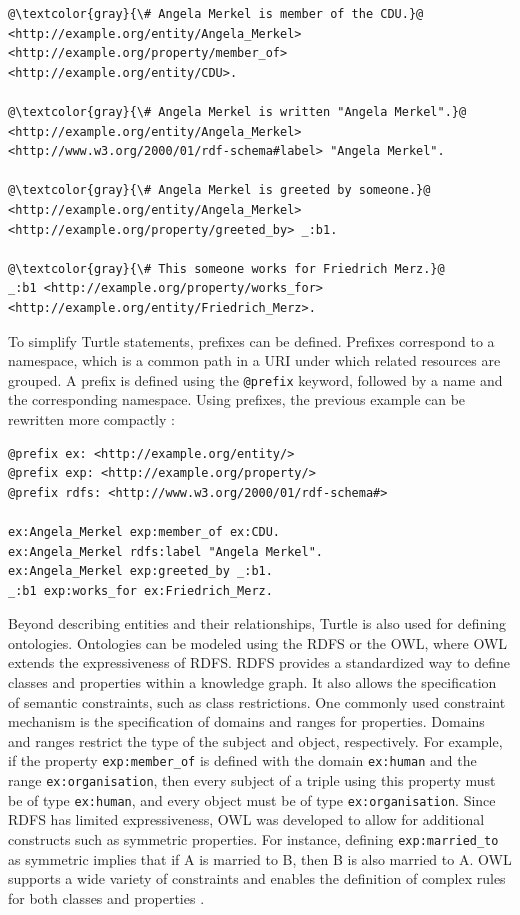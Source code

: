 \documentclass[a4paper,oneside,bibliography=totoc]{scrbook}
\begin{document}
\begin{lstlisting}[language=Turtle, caption=Example of a Knowledge Graph in Turtle Format, label=lst:turtle_example, escapechar=@]
@\textcolor{gray}{\# Angela Merkel is member of the CDU.}@
<http://example.org/entity/Angela_Merkel> <http://example.org/property/member_of> <http://example.org/entity/CDU>.

@\textcolor{gray}{\# Angela Merkel is written "Angela Merkel".}@
<http://example.org/entity/Angela_Merkel> <http://www.w3.org/2000/01/rdf-schema#label> "Angela Merkel".

@\textcolor{gray}{\# Angela Merkel is greeted by someone.}@
<http://example.org/entity/Angela_Merkel> <http://example.org/property/greeted_by> _:b1.

@\textcolor{gray}{\# This someone works for Friedrich Merz.}@
_:b1 <http://example.org/property/works_for> <http://example.org/entity/Friedrich_Merz>.
\end{lstlisting}

To simplify Turtle statements, prefixes can be defined. Prefixes correspond to a namespace, which is a common path in a \ac{URI} under which related resources are grouped. A prefix is defined using the \texttt{@prefix} keyword, followed by a name and the corresponding namespace. Using prefixes, the previous example can be rewritten more compactly \cite{Tomaszuk2020}:

\begin{lstlisting}[language=Turtle, caption=Example of a Knowledge Graph in Turtle Format with Prefixes, label=lst:turtle_example]
@prefix ex: <http://example.org/entity/>
@prefix exp: <http://example.org/property/>
@prefix rdfs: <http://www.w3.org/2000/01/rdf-schema#>

ex:Angela_Merkel exp:member_of ex:CDU.
ex:Angela_Merkel rdfs:label "Angela Merkel".
ex:Angela_Merkel exp:greeted_by _:b1.
_:b1 exp:works_for ex:Friedrich_Merz.
\end{lstlisting}

Beyond describing entities and their relationships, Turtle is also used for defining ontologies. Ontologies can be modeled using the \ac{RDFS} or the \ac{OWL}, where OWL extends the expressiveness of RDFS. \ac{RDFS} provides a standardized way to define classes and properties within a knowledge graph. It also allows the specification of semantic constraints, such as class restrictions. One commonly used constraint mechanism is the specification of domains and ranges for properties. Domains and ranges restrict the type of the subject and object, respectively. For example, if the property \texttt{exp:member\_of} is defined with the domain \texttt{ex:human} and the range \texttt{ex:organisation}, then every subject of a triple using this property must be of type \texttt{ex:human}, and every object must be of type \texttt{ex:organisation}. Since \ac{RDFS} has limited expressiveness, \ac{OWL} was developed to allow for additional constructs such as symmetric properties. For instance, defining \texttt{exp:married\_to} as symmetric implies that if A is married to B, then B is also married to A. \ac{OWL} supports a wide variety of constraints and enables the definition of complex rules for both classes and properties \cite{VillazonTerrazas2017}.
\end{document}
